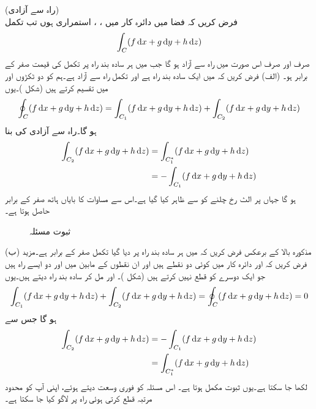 \quad (راہ سے آزادی)\\
فرض کریں کہ فضا میں دائرہ کار  میں ، ،  استمراری ہوں تب تکمل
\begin{align*}
\int_C (f\dif x+g\dif y+h\dif z)
\end{align*}
صرف اور صرف اس صورت  میں  راہ سے آزاد ہو گا جب  میں ہر سادہ بند راہ پر تکمل کی قیمت صفر کے برابر ہو۔ 
(الف) فرض کریں کہ  میں  ایک سادہ بند راہ ہے اور تکمل راہ سے آزاد ہے۔ہم  کو دو ٹکڑوں  اور  میں تقسیم کرتے ہیں (شکل )۔یوں
\begin{align}\label{مساوات_خطی_تکمل_دائری_تکمل_صفر_الف}
\oint_C (f\dif x+g\dif y+h\dif z)=\int_{C_1}(f\dif x+g\dif y+h\dif z)+\int_{C_2}(f\dif x+g\dif y+h\dif z)
\end{align}
ہو گا۔راہ سے آزادی کی بنا
\begin{align*}
\int_{C_2}(f\dif x+g\dif y+h\dif z)&=\int_{C_1^*}(f\dif x+g\dif y+h\dif z)\\
&=-\int_{C_1}(f\dif x+g\dif y+h\dif z)
\end{align*}
ہو گا جہاں  پر الٹ رخ چلنے کو  سے ظاہر کیا گیا ہے۔اس سے مساوات  کا بایاں ہاتھ صفر کے برابر حاصل ہوتا ہے۔
\begin{figure}
\centering
{}
\caption{ثبوت مسئلہ }
\label{شکل_مسئلہ_خطی_تکمل_ثبوت_دائری_تکمل_صفر}
\end{figure}
(ب) مذکورہ بالا کے برعکس فرض کریں کہ  میں ہر سادہ بند  راہ پر دیا گیا تکمل  صفر کے برابر ہے۔مزید فرض کریں کہ  اور  دائرہ کار  میں کوئی دو نقطے ہیں اور ان نقطوں کے مابین  میں  اور  دو ایسے راہ ہیں جو ایک دوسرے کو قطع نہیں کرتے ہیں (شکل )۔ اور  مل کر سادہ بند راہ دیتے ہیں۔یوں
\begin{align*}
\int_{C_1} (f\dif x+g\dif y+h\dif z)+\int_{C_2} (f\dif x+g\dif y+h\dif z)=\oint_{C} (f\dif x+g\dif y+h\dif z)=0
\end{align*}
ہو گا جس سے
\begin{align*}
\int_{C_2} (f\dif x+g\dif y+h\dif z)&=-\int_{C_1} (f\dif x+g\dif y+h\dif z)\\
&=\int_{C^*_1} (f\dif x+g\dif y+h\dif z)
\end{align*}
لکھا جا سکتا ہے۔یوں ثبوت مکمل ہوتا ہے۔
اس مسئلہ کو فوری  وسعت دیتے ہوئے، اپنی آپ کو محدود مرتبہ  قطع کرتی ہوئی راہ پر لاگو کیا جا سکتا ہے۔

